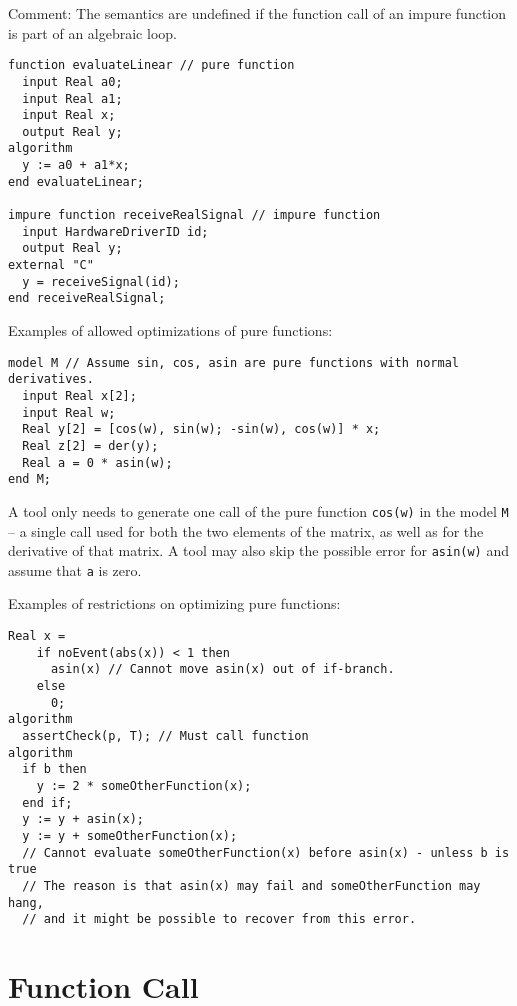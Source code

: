 \begin{nonnormative}
Comment: The semantics are undefined if the function call of an
impure function is part of an algebraic loop.
\end{nonnormative}

\begin{example}
\begin{lstlisting}[language=modelica]
function evaluateLinear // pure function
  input Real a0;
  input Real a1;
  input Real x;
  output Real y;
algorithm
  y := a0 + a1*x;
end evaluateLinear;

impure function receiveRealSignal // impure function
  input HardwareDriverID id;
  output Real y;
external "C"
  y = receiveSignal(id);
end receiveRealSignal;
\end{lstlisting}
Examples of allowed optimizations of pure functions:
\begin{lstlisting}[language=modelica]
model M // Assume sin, cos, asin are pure functions with normal derivatives.
  input Real x[2];
  input Real w;
  Real y[2] = [cos(w), sin(w); -sin(w), cos(w)] * x;
  Real z[2] = der(y);
  Real a = 0 * asin(w);
end M;
\end{lstlisting}
A tool only needs to generate one call of the pure function \lstinline!cos(w)! in the model \lstinline!M! -- a single call used for both the two elements of the matrix, as well as for the derivative of that matrix.
A tool may also skip the possible error for \lstinline!asin(w)! and assume that \lstinline!a! is zero.

Examples of restrictions on optimizing pure functions:
\begin{lstlisting}[language=modelica]
  Real x =
    if noEvent(abs(x)) < 1 then
      asin(x) // Cannot move asin(x) out of if-branch.
    else
      0;
algorithm
  assertCheck(p, T); // Must call function
algorithm
  if b then
    y := 2 * someOtherFunction(x);
  end if;
  y := y + asin(x);
  y := y + someOtherFunction(x);
  // Cannot evaluate someOtherFunction(x) before asin(x) - unless b is true
  // The reason is that asin(x) may fail and someOtherFunction may hang,
  // and it might be possible to recover from this error.
\end{lstlisting}
\end{example}

\section{Function Call}\label{function-call}

